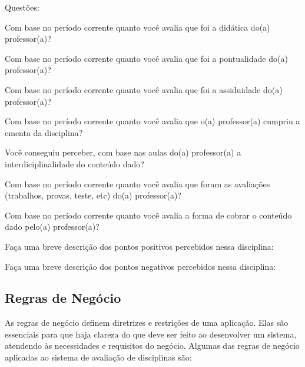 Questões:
\begin{alineas}
\item Com base no período corrente quanto você avalia que foi a didática do(a) professor(a)?
\item Com base no período corrente quanto você avalia que foi a pontualidade do(a) professor(a)?
\item Com base no período corrente quanto você avalia que foi a assiduidade do(a) professor(a)?
\item Com base no período corrente quanto você avalia que o(a) professor(a) cumpriu a ementa da disciplina?
\item Você conseguiu perceber, com base nas aulas do(a) professor(a) a interdiciplinalidade do conteúdo dado?
\item Com base no período corrente quanto você avalia que foram as avaliações (trabalhos, provas, teste, etc) do(a) professor(a)?
\item Com base no período corrente quanto você avalia a forma de cobrar o conteúdo dado pelo(a) professor(a)?
\item Faça uma breve descrição dos pontos positivos percebidos nessa disciplina:
\item Faça uma breve descrição dos pontos negativos percebidos nessa disciplina:
\end{alineas}


\subsection{Regras de Negócio}
As regras de negócio definem diretrizes e restrições de uma aplicação. Elas são essenciais para que haja clareza do que deve ser feito ao desenvolver um sistema, atendendo às necessidades e requisitos do negócio. Algumas das regras de negócio aplicadas ao sistema de avaliação de disciplinas são:


